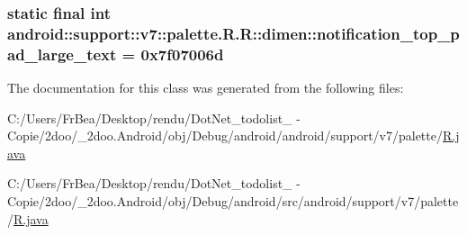 \hypertarget{classandroid_1_1support_1_1v7_1_1palette_1_1_r_1_1dimen_7025574c1102f78dac75077dbb2fe391}{
\subsubsection[{notification\_\-top\_\-pad\_\-large\_\-text}]{\setlength{\rightskip}{0pt plus 5cm}static final int android::support::v7::palette.R.R::dimen::notification\_\-top\_\-pad\_\-large\_\-text = 0x7f07006d}}
\label{classandroid_1_1support_1_1v7_1_1palette_1_1_r_1_1dimen_7025574c1102f78dac75077dbb2fe391}




The documentation for this class was generated from the following files:\begin{CompactItemize}
\item 
C:/Users/FrBea/Desktop/rendu/DotNet\_\-todolist\_ - Copie/2doo/\_\-2doo.Android/obj/Debug/android/android/support/v7/palette/\hyperlink{android_2support_2v7_2palette_2_r_8java}{R.java}\item 
C:/Users/FrBea/Desktop/rendu/DotNet\_\-todolist\_ - Copie/2doo/\_\-2doo.Android/obj/Debug/android/src/android/support/v7/palette/\hyperlink{src_2android_2support_2v7_2palette_2_r_8java}{R.java}\end{CompactItemize}
